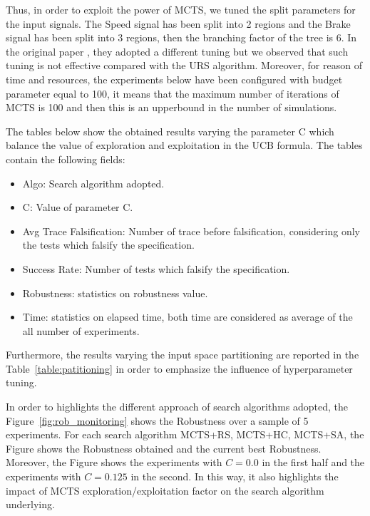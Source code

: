 \documentclass[11pt]{article}
\begin{document}
Thus, in order to exploit the power of MCTS, we tuned the split parameters for the input signals. The Speed signal has been split into 2 regions and the Brake signal has been split into 3 regions, then the branching factor of the tree is 6. In the original paper \cite{zhang2018two}, they
adopted a different tuning but we observed that such tuning is not effective compared with the URS algorithm. Moreover, for reason of time and resources, the experiments below have been configured with budget parameter equal to 100, it means that the maximum number of iterations of MCTS is 100 and then this is an upperbound in the number of simulations.

The tables below show the obtained results varying the parameter C which balance the value of exploration and exploitation in the UCB formula. The tables contain the following fields:
\begin{itemize}
    \item Algo: Search algorithm adopted.
    \item C: Value of parameter C.
    \item Avg Trace Falsification: Number of trace before falsification, considering only the tests which falsify the specification.
    \item Success Rate: Number of tests which falsify the specification.
    \item Robustness: statistics on robustness value.
    \item Time: statistics on elapsed time, both time are considered as average of the all number of experiments.
\end{itemize}

Furthermore, the results varying the input space partitioning are reported in the Table~\ref{table:patitioning} in order to emphasize the influence of hyperparameter tuning.

In order to highlights the different approach of search algorithms adopted, the Figure~\ref{fig:rob_monitoring} shows the Robustness over a sample of 5 experiments. For each search algorithm MCTS+RS, MCTS+HC, MCTS+SA, the Figure shows the Robustness obtained and the current best Robustness. Moreover, the Figure shows the experiments with $C=0.0$ in the first half and the experiments with $C=0.125$ in the second. In this way, it also highlights the impact of MCTS exploration/exploitation factor on the search algorithm underlying.
\end{document}
